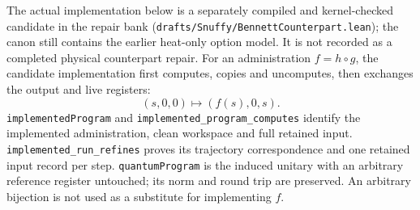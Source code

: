 \documentclass[
]{article}
\begin{document}
The actual implementation below is a separately compiled and
kernel-checked candidate in the repair bank
(\texttt{d\allowbreak{}r\allowbreak{}a\allowbreak{}f\allowbreak{}t\allowbreak{}s\allowbreak{}/\allowbreak{}S\allowbreak{}n\allowbreak{}u\allowbreak{}f\allowbreak{}f\allowbreak{}y\allowbreak{}/\allowbreak{}B\allowbreak{}e\allowbreak{}n\allowbreak{}n\allowbreak{}e\allowbreak{}t\allowbreak{}t\allowbreak{}C\allowbreak{}o\allowbreak{}u\allowbreak{}n\allowbreak{}t\allowbreak{}e\allowbreak{}r\allowbreak{}p\allowbreak{}a\allowbreak{}r\allowbreak{}t\allowbreak{}.\allowbreak{}l\allowbreak{}e\allowbreak{}a\allowbreak{}n});
the canon still contains the earlier heat-only option model. It is not
recorded as a completed physical counterpart repair. For an
administration \(f=h\circ g\), the candidate implementation first
computes, copies and uncomputes, then exchanges the output and live
registers: \[
(s,0,0)\longmapsto(f(s),0,s).
\]
\texttt{i\allowbreak{}m\allowbreak{}p\allowbreak{}l\allowbreak{}e\allowbreak{}m\allowbreak{}e\allowbreak{}n\allowbreak{}t\allowbreak{}e\allowbreak{}d\allowbreak{}P\allowbreak{}r\allowbreak{}o\allowbreak{}g\allowbreak{}r\allowbreak{}a\allowbreak{}m}
and
\texttt{i\allowbreak{}m\allowbreak{}p\allowbreak{}l\allowbreak{}e\allowbreak{}m\allowbreak{}e\allowbreak{}n\allowbreak{}t\allowbreak{}e\allowbreak{}d\allowbreak{}\_\allowbreak{}p\allowbreak{}r\allowbreak{}o\allowbreak{}g\allowbreak{}r\allowbreak{}a\allowbreak{}m\allowbreak{}\_\allowbreak{}c\allowbreak{}o\allowbreak{}m\allowbreak{}p\allowbreak{}u\allowbreak{}t\allowbreak{}e\allowbreak{}s}
identify the implemented administration, clean workspace and full
retained input.
\texttt{i\allowbreak{}m\allowbreak{}p\allowbreak{}l\allowbreak{}e\allowbreak{}m\allowbreak{}e\allowbreak{}n\allowbreak{}t\allowbreak{}e\allowbreak{}d\allowbreak{}\_\allowbreak{}r\allowbreak{}u\allowbreak{}n\allowbreak{}\_\allowbreak{}r\allowbreak{}e\allowbreak{}f\allowbreak{}i\allowbreak{}n\allowbreak{}e\allowbreak{}s}
proves its trajectory correspondence and one retained input record per
step. \texttt{quantumProgram} is the induced unitary with an arbitrary
reference register untouched; its norm and round trip are preserved. An
arbitrary bijection is not used as a substitute for implementing \(f\).
\end{document}
